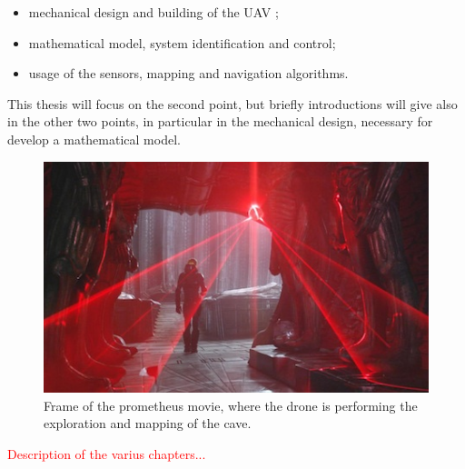 \begin{itemize}
	\item mechanical design and building of the UAV \cite{Carlos};
	\item mathematical model, system identification and control;
	\item usage of the sensors, mapping and navigation algorithms.
\end{itemize}

\noindent This thesis will focus on the second point, but briefly introductions will give also in the other two points, in particular in the mechanical design, necessary for develop a mathematical model. 

\begin{figure}
	\includegraphics[scale=0.6]{images/prometheus_film.jpg}
	\caption{Frame of the prometheus movie, where the drone is performing the exploration and mapping of the cave.}
	\label{fig:prometheusFILM}
\end{figure}

\noindent \textcolor{red}{Description of the varius chapters...}